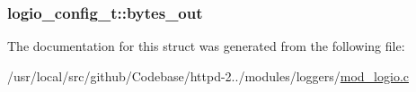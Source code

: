 \subsubsection[{\texorpdfstring{bytes\+\_\+out}{bytes_out}}]{ logio\+\_\+config\+\_\+t\+::bytes\+\_\+out}\hypertarget{structlogio__config__t_afdd34457f170abdc381a7b1a473f25f9}{}\label{structlogio__config__t_afdd34457f170abdc381a7b1a473f25f9}


The documentation for this struct was generated from the following file\+:\begin{DoxyCompactItemize}
\item 
/usr/local/src/github/\+Codebase/httpd-\/2../modules/loggers/\hyperlink{mod__logio_8c}{mod\+\_\+logio.\+c}\end{DoxyCompactItemize}
